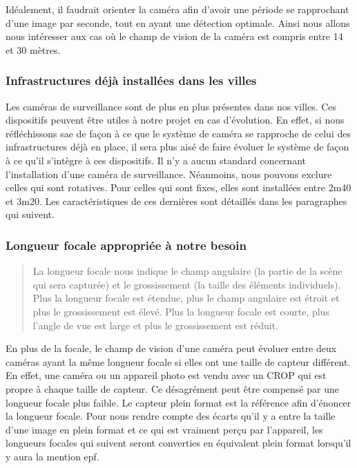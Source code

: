 Idéalement, il faudrait orienter la caméra afin d'avoir une période se rapprochant d'une image par seconde, tout en ayant une détection optimale.
Ainsi nous allons nous intéresser aux cas où le champ de vision de la caméra est compris entre 14 et 30 mètres.

\subsubsection{Infrastructures déjà installées dans les villes}
\label{sec:camera_infra}
Les caméras de surveillance sont de plus en plus présentes dans nos villes. Ces dispositifs peuvent être utiles à notre projet en cas d'évolution.
En effet, si nous réfléchissons \gls{sae} de façon à ce que le système de caméra se rapproche de celui des infrastructures déjà en place,
il sera plus aisé de faire évoluer le système de façon à ce qu'il s'intègre à ces dispositifs.
Il n'y a aucun standard concernant l'installation d'une caméra de surveillance. Néanmoins, nous pouvons exclure celles qui sont rotatives.
Pour celles qui sont fixes, elles sont installées entre 2m40 et 3m20. Les caractéristiques de ces dernières sont détaillés dans les paragraphes qui suivent.

\subsubsection{Longueur focale appropriée à notre besoin}
\label{sec:camera_focale}

\blockquote{La longueur focale nous indique le champ angulaire (la partie de la scène qui sera capturée)
    et le grossissement (la taille des éléments individuels).
    Plus la longueur focale est étendue, plus le champ angulaire est étroit et plus le grossissement est élevé.
    Plus la longueur focale est courte, plus l’angle de vue est large et plus le grossissement est réduit.}{\cite{focale}}

En plus de la focale, le champ de vision d'une caméra peut évoluer entre deux caméras ayant la même longueur focale
si elles ont une taille de capteur différent.
En effet, une caméra ou un appareil photo est vendu avec un \gls{CROP} qui est propre à chaque taille de capteur.
Ce désagrément peut être compensé par une longueur focale plus faible.
Le capteur plein format est la référence afin d'énoncer la longueur focale.
Pour nous rendre compte des écarts qu'il y a entre la taille d'une image en plein format et ce qui est vraiment perçu par l'appareil,
les longueurs focales qui suivent seront converties en équivalent plein format lorsqu'il y aura la mention \gls{epf}.

